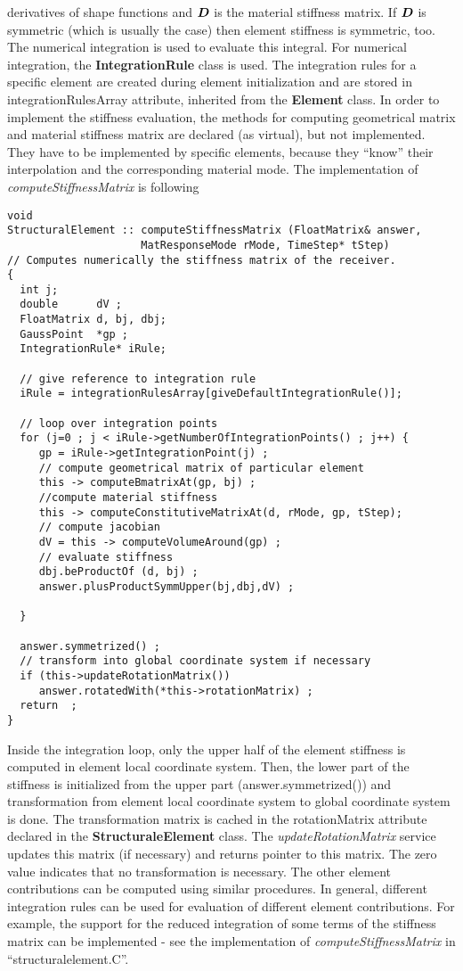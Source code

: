 \documentclass[12pt,draft]{article}
\newcommand{\class}[1]{{\bf #1}}
\newcommand{\service}[1]{{\em #1}}
\newcommand{\attribute}[1]{#1}
\newcommand{\file}[1]{``#1''}
\newcommand{\mbf}[1]{\mbox{\boldmath$#1$}}
\begin{document}
derivatives of shape functions and $\mbf{D}$ is the material stiffness
matrix. If $\mbf{D}$ is symmetric (which is usually the case) then
element stiffness is symmetric, too. The numerical integration is used to evaluate this integral.
For numerical integration, the  \class{IntegrationRule} class is used.
The integration rules for a specific element are created during element
initialization and are stored in \attribute{integrationRulesArray} attribute,
inherited from the \class{Element} class. In order to implement the stiffness
evaluation, the methods for computing geometrical matrix and material stiffness
matrix are declared (as virtual), but not implemented. They have to
be implemented by specific elements, because they ``know'' their interpolation
and the corresponding material mode. 
The implementation of
\service{computeStiffnessMatrix} is following
\begin{verbatim}
void
StructuralElement :: computeStiffnessMatrix (FloatMatrix& answer, 
                     MatResponseMode rMode, TimeStep* tStep)
// Computes numerically the stiffness matrix of the receiver.
{
  int j;
  double      dV ;
  FloatMatrix d, bj, dbj;
  GaussPoint  *gp ;
  IntegrationRule* iRule;

  // give reference to integration rule
  iRule = integrationRulesArray[giveDefaultIntegrationRule()];
     
  // loop over integration points
  for (j=0 ; j < iRule->getNumberOfIntegrationPoints() ; j++) {
     gp = iRule->getIntegrationPoint(j) ;
     // compute geometrical matrix of particular element 
     this -> computeBmatrixAt(gp, bj) ;  
     //compute material stiffness
     this -> computeConstitutiveMatrixAt(d, rMode, gp, tStep); 
     // compute jacobian
     dV = this -> computeVolumeAround(gp) ; 
     // evaluate stiffness
     dbj.beProductOf (d, bj) ;
     answer.plusProductSymmUpper(bj,dbj,dV) ; 

  }
 
  answer.symmetrized() ;
  // transform into global coordinate system if necessary
  if (this->updateRotationMatrix()) 
     answer.rotatedWith(*this->rotationMatrix) ;
  return  ;
}
\end{verbatim}
Inside the integration loop, only the upper half of the element stiffness is
computed in element local coordinate system. Then, the lower part of 
the stiffness is initialized from the upper part (answer.symmetrized()) and
transformation from element local coordinate system to global
coordinate system is done. The transformation matrix is cached in
the \attribute{rotationMatrix} attribute declared in the \class{StructuraleElement} class. 
The \service{updateRotationMatrix} service
updates this matrix (if necessary) and returns pointer to this matrix.
The zero value indicates that no transformation is necessary. 
The other element contributions can be computed using similar
procedures. In general, different integration rules can be used for
evaluation of different element contributions. For example, the
support for the reduced
integration of some terms of the stiffness matrix can be implemented - see
the implementation of \service{computeStiffnessMatrix} in \file{structuralelement.C}.
\end{document}
